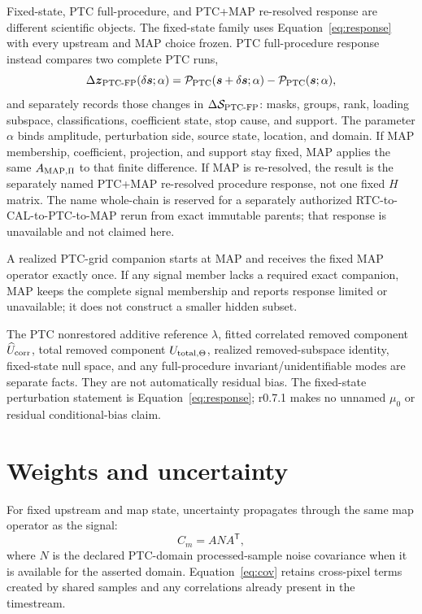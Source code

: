 \documentclass[10pt]{article}
\begin{document}
Fixed-state, PTC full-procedure, and PTC+MAP re-resolved response are different
scientific objects. The fixed-state family uses Equation~\eqref{eq:response}
with every upstream and MAP choice frozen. PTC full-procedure response instead
compares two complete PTC runs,
\[
 \Delta\boldsymbol z_{{\rm PTC}\text{-}{\rm FP}}(\delta\boldsymbol s;\alpha)
 =\mathcal P_{\rm PTC}(\boldsymbol s+\delta\boldsymbol s;\alpha)
  -\mathcal P_{\rm PTC}(\boldsymbol s;\alpha),
\]
and separately records those changes in
\(\Delta\mathcal S_{{\rm PTC}\text{-}{\rm FP}}\): masks, groups, rank, loading subspace,
classifications, coefficient state, stop cause, and support. The parameter
\(\alpha\) binds amplitude, perturbation side, source state, location, and
domain. If MAP membership, coefficient, projection, and support stay fixed,
MAP applies the same \(A_{{\rm MAP},\Pi}\) to that finite difference. If MAP
is re-resolved, the result is the separately named PTC+MAP re-resolved
procedure response, not one fixed \(H\) matrix. The name whole-chain is
reserved for a separately authorized RTC-to-CAL-to-PTC-to-MAP rerun from
exact immutable parents; that response is unavailable and not claimed here.

A realized PTC-grid companion starts at MAP and receives the fixed MAP
operator exactly once. If any signal member lacks a required exact companion,
MAP keeps the complete signal membership and reports response limited or
unavailable; it does not construct a smaller hidden subset.

The PTC nonrestored additive reference \(\lambda\), fitted correlated removed
component \(\widehat U_{\rm corr}\), total removed component
\(U_{{\rm total},\Theta}\), realized removed-subspace identity, fixed-state
null space, and any full-procedure invariant/unidentifiable modes are separate
facts. They are not automatically residual bias. The fixed-state perturbation
statement is Equation~\eqref{eq:response}; r0.7.1 makes no unnamed \(\mu_0\) or
residual conditional-bias claim.

\clearpage
\section{Weights and uncertainty}\label{sec:uncertainty}
For fixed upstream and map state, uncertainty propagates through the same map
operator as the signal:
\begin{equation}
 C_m=A N A^{\mathsf T},
 \label{eq:cov}
\end{equation}
where \(N\) is the declared PTC-domain processed-sample noise covariance when
it is available for the asserted domain. Equation~\eqref{eq:cov}
retains cross-pixel terms created by shared samples and any correlations
already present in the timestream.
\end{document}
